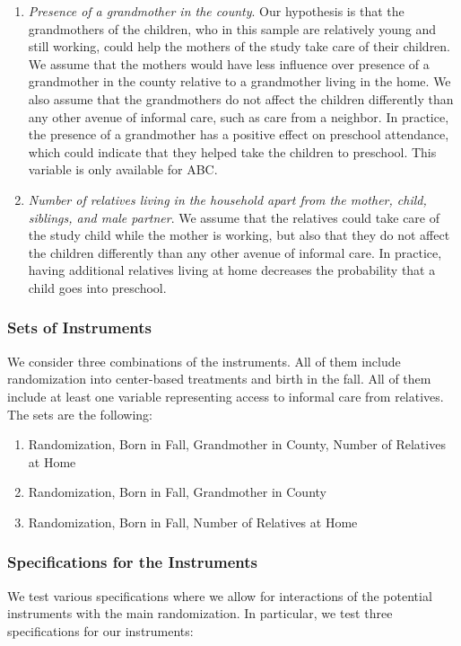 \begin{appendices}
\begin{enumerate}
\item \textit{Presence of a grandmother in the county}. Our hypothesis is that the grandmothers of the children, who in this sample are relatively young and still working, could help the mothers of the study take care of their children. We assume that the mothers would have less influence over presence of a grandmother in the county relative to a grandmother living in the home. We also assume that the grandmothers do not affect the children differently than any other avenue of informal care, such as care from a neighbor. In practice, the presence of a grandmother has a positive effect on preschool attendance, which could indicate that they helped take the children to preschool. This variable is only available for ABC.

\item \textit{Number of relatives living in the household apart from the mother, child, siblings, and male partner}. We assume that the relatives could take care of the study child while the mother is working, but also that they do not affect the children differently than any other avenue of informal care. In practice, having additional relatives living at home decreases the probability that a child goes into preschool.
\end{enumerate}

\subsubsection{Sets of Instruments}
\noindent We consider three combinations of the instruments.  All of them include randomization into center-based treatments and birth in the fall. All of them include at least one variable representing access to informal care from relatives. The sets are the following:
\begin{enumerate}
\item Randomization, Born in Fall, Grandmother in County, Number of Relatives at Home
\item Randomization, Born in Fall, Grandmother in County
\item Randomization, Born in Fall, Number of Relatives at Home
\end{enumerate}

\subsubsection{Specifications for the Instruments}
\noindent We test various specifications where we allow for interactions of the potential instruments with the main randomization. In particular, we test three specifications for our instruments:


\end{appendices}
